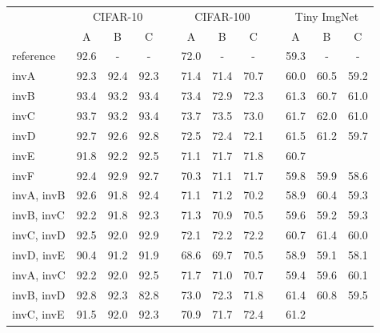 \begin{table}
  \renewcommand{\arraystretch}{1.2}
  \centering
  \begin{tabular}{@{}lccclccclccc@{}}
    \toprule
    & \multicolumn{3}{c}{CIFAR-10} & \phantom{abc} & \multicolumn{3}{c}{CIFAR-100} & \phantom{abc} & \multicolumn{3}{c}{Tiny ImgNet} \\ \cline{2-4}\cline{6-8}\cline{10-12}
    \phantom{abc} & A  & B & C &&  A & B & C && A & B & C \\ \midrule
    reference & 92.6 & - & - && 72.0 & - & - && 59.3 & - & - \\ \midrule
    invA      & 92.3 & 92.4 & 92.3 && 71.4 & 71.4 & 70.7 && 60.0 & 60.5 & 59.2 \\
    invB      & 93.4 & 93.2 & 93.4 && 73.4 & 72.9 & 72.3 && 61.3 & 60.7 & 61.0 \\
    invC      & 93.7 & 93.2 & 93.4 && 73.7 & 73.5 & 73.0 && 61.7 & 62.0 & 61.0 \\
    invD      & 92.7 & 92.6 & 92.8 && 72.5 & 72.4 & 72.1 && 61.5 & 61.2 & 59.7 \\
    invE      & 91.8 & 92.2 & 92.5 && 71.1 & 71.7 & 71.8 && 60.7 & &  \\
    invF      & 92.4 & 92.9 & 92.7 && 70.3 & 71.1 & 71.7 && 59.8 & 59.9 & 58.6 \\
    invA, invB& 92.6 & 91.8 & 92.4 && 71.1 & 71.2 & 70.2 && 58.9 & 60.4 & 59.3 \\
    invB, invC& 92.2 & 91.8 & 92.3 && 71.3 & 70.9 & 70.5 && 59.6 & 59.2 & 59.3 \\
    invC, invD& 92.5 & 92.0 & 92.9 && 72.1 & 72.2 & 72.2 && 60.7 & 61.4 & 60.0 \\
    invD, invE& 90.4 & 91.2 & 91.9 && 68.6 & 69.7 & 70.5 && 58.9 & 59.1 & 58.1 \\
    invA, invC& 92.2 & 92.0 & 92.5 && 71.7 & 71.0 & 70.7 && 59.4 & 59.6 & 60.1 \\
    invB, invD& 92.8 & 92.3 & 82.8 && 73.0 & 72.3 & 71.8 && 61.4 & 60.8 & 59.5 \\
    invC, invE& 91.5 & 92.0 & 92.3 && 70.9 & 71.7 & 72.4 && 61.2 & & \\ \bottomrule
  \end{tabular}\label{tab:ch5:conv_results}
\end{table}

